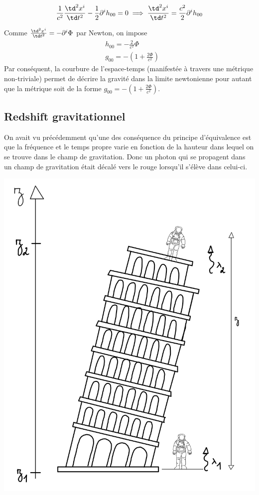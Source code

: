 \begin{align}
   \frac{1}{c^2} \frac{\td ^2 x^{i}}{\td t^2} -\frac{1}{2}\partial^{i}h_{00}=0\implies \frac{\td ^2 x^{i}}{\td t^2} = \frac{c^2}{2}\partial^{i}h_{00}
\end{align}

Comme $\frac{\td ^2 x^{i}}{\td t^2} = -\partial^{i}\Phi$ par Newton, on impose
\begin{align}
    &h_{00} = -\frac{2}{c^2}\Phi\\
    &\boxed{g_{00} = -\left(1 + \frac{2\Phi}{c^2}\right)}
\end{align}
Par conséquent, la courbure de l'espace-temps (manifestée à travers une métrique non-triviale) permet de décrire la gravité dans la limite newtonienne pour autant que la métrique soit de la forme $g_{00} = -\left(1 + \frac{2\Phi}{c^2}\right)$.

\subsection{Redshift gravitationnel}

On avait vu précédemment qu'une des conséquence du principe d'équivalence est que la fréquence et le temps propre varie en fonction de la hauteur dans lequel on se trouve dans le champ de gravitation. Donc un photon qui se propagent dans un champ de gravitation était décalé vers le rouge lorsqu'il s’élève dans celui-ci. 

\begin{center} \includegraphics[scale=0.15]{Chapitres/5. Géodésiques/Images/tour de pise.jpg} 
\end{center}

